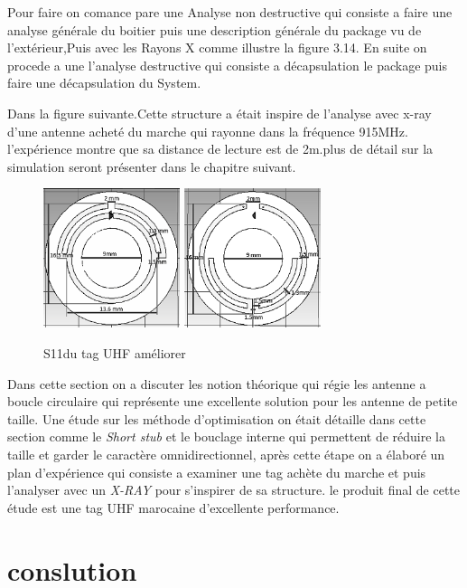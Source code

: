 \documentclass[11pt, a4paper, twoside]{book}
\begin{document}
Pour faire on comance pare une Analyse non destructive qui consiste a faire une analyse générale  du boitier puis une description générale du package vu de l’extérieur,Puis avec les Rayons X comme illustre la figure 3.14. En suite on procede a une l'analyse destructive qui consiste a décapsulation le package puis faire une décapsulation du System.



Dans la figure suivante.Cette structure a était inspire de l'analyse avec x-ray d'une antenne acheté du marche qui rayonne dans la fréquence 915MHz. l'expérience montre que sa distance de lecture est de 2m.plus de détail sur la simulation seront présenter dans le chapitre suivant.\\

\begin{figure}[H]
\centering
\includegraphics[width=4cm]{front11}
\includegraphics[width=4cm]{back22}
\caption{S11du tag UHF améliorer }
\end{figure}

Dans cette section on a discuter les notion théorique qui régie les antenne a boucle circulaire qui représente une excellente solution pour les antenne de petite taille. Une étude sur les méthode d'optimisation on était détaille dans cette section comme le \emph{Short stub} et le bouclage interne qui permettent de réduire la taille et garder le caractère omnidirectionnel, après cette étape on a élaboré un plan d'expérience qui consiste a examiner une tag achète du marche et puis l'analyser avec un \emph{X-RAY} pour s'inspirer de sa structure. le produit final de cette étude est une tag UHF marocaine d'excellente performance.
\section{conslution}
\end{document}
